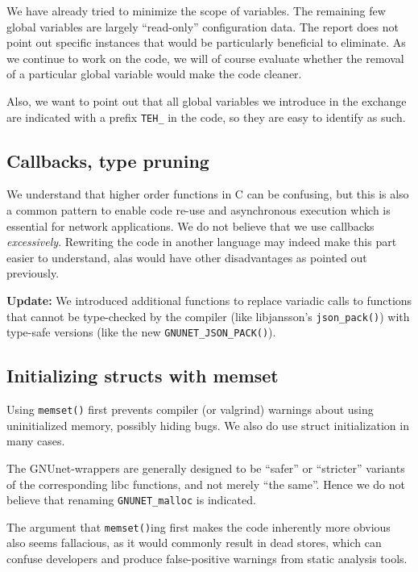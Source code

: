 \documentclass[11pt]{article}
\begin{document}
We have already tried to minimize the scope of variables. The remaining few
global variables are largely ``read-only'' configuration data. The report does
not point out specific instances that would be particularly beneficial to
eliminate. As we continue to work on the code, we will of course evaluate
whether the removal of a particular global variable would make the code
cleaner.

Also, we want to point out that all global variables we introduce
in the exchange are indicated with a prefix {\tt TEH\_} in the code, so they
are easy to identify as such.

\subsection{Callbacks, type pruning}

We understand that higher order functions in C can be confusing, but this
is also a common pattern to enable code re-use and asynchronous execution
which is essential for network applications. We do not believe that we
use callbacks {\em excessively}.  Rewriting the code in another language
may indeed make this part easier to understand, alas would have other
disadvantages as pointed out previously.

{\bf Update:} We introduced additional functions to replace
variadic calls to functions that cannot be type-checked by
the compiler (like libjansson's {\tt json\_pack()}) with
type-safe versions (like the new {\tt GNUNET\_JSON\_PACK()}).


\subsection{Initializing structs with memset}

Using {\tt memset()} first prevents compiler (or valgrind) warnings about
using uninitialized memory, possibly hiding bugs. We also do use struct
initialization in many cases.

The GNUnet-wrappers are generally designed to be ``safer'' or ``stricter''
variants of the corresponding libc functions, and not merely ``the same''.
Hence we do not believe that renaming {\tt GNUNET\_malloc} is indicated.

The argument that {\tt memset()}ing first makes the code inherently more
obvious also seems fallacious, as it would commonly result in dead stores,
which can confuse developers and produce false-positive warnings from static
analysis tools.
\end{document}
